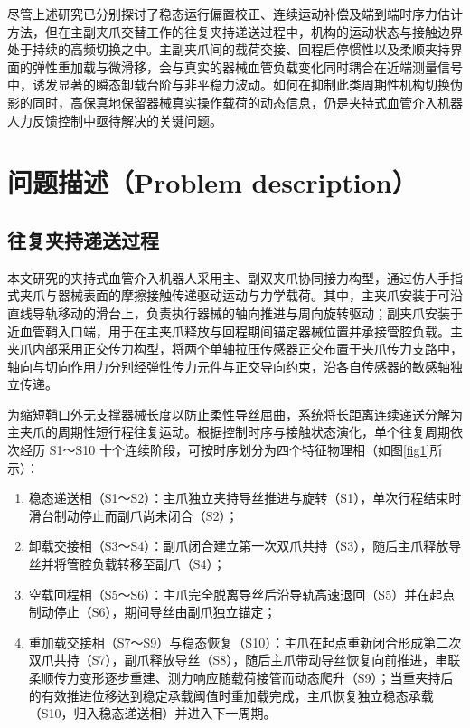 \documentclass{JQRnew}
\begin{document}
尽管上述研究已分别探讨了稳态运行偏置校正、连续运动补偿及端到端时序力估计方法，但在主副夹爪交替工作的往复夹持递送过程中，机构的运动状态与接触边界处于持续的高频切换之中。主副夹爪间的载荷交接、回程启停惯性以及柔顺夹持界面的弹性重加载与微滑移，会与真实的器械血管负载变化同时耦合在近端测量信号中，诱发显著的瞬态卸载台阶与非平稳力波动。如何在抑制此类周期性机构切换伪影的同时，高保真地保留器械真实操作载荷的动态信息，仍是夹持式血管介入机器人力反馈控制中亟待解决的关键问题。

\section{问题描述（Problem description）}

\subsection{往复夹持递送过程}

本文研究的夹持式血管介入机器人采用主、副双夹爪协同接力构型，通过仿人手指式夹爪与器械表面的摩擦接触传递驱动运动与力学载荷。其中，主夹爪安装于可沿直线导轨移动的滑台上，负责执行器械的轴向推进与周向旋转驱动；副夹爪安装于近血管鞘入口端，用于在主夹爪释放与回程期间锚定器械位置并承接管腔负载。主夹爪内部采用正交传力构型，将两个单轴拉压传感器正交布置于夹爪传力支路中，轴向与切向作用力分别经弹性传力元件与正交导向约束，沿各自传感器的敏感轴独立传递。

为缩短鞘口外无支撑器械长度以防止柔性导丝屈曲，系统将长距离连续递送分解为主夹爪的周期性短行程往复运动。根据控制时序与接触状态演化，单个往复周期依次经历 S1～S10 十个连续阶段，可按时序划分为四个特征物理相（如图\ref{fig1}所示）：
\begin{enumerate}
\item[1)] 稳态递送相（S1～S2）：主爪独立夹持导丝推进与旋转（S1），单次行程结束时滑台制动停止而副爪尚未闭合（S2）；
\item[2)] 卸载交接相（S3～S4）：副爪闭合建立第一次双爪共持（S3），随后主爪释放导丝并将管腔负载转移至副爪（S4）；
\item[3)] 空载回程相（S5～S6）：主爪完全脱离导丝后沿导轨高速退回（S5）并在起点制动停止（S6），期间导丝由副爪独立锚定；
\item[4)] 重加载交接相（S7～S9）与稳态恢复（S10）：主爪在起点重新闭合形成第二次双爪共持（S7），副爪释放导丝（S8），随后主爪带动导丝恢复向前推进，串联柔顺传力变形逐步重建、测力响应随载荷接管而动态爬升（S9）；当重夹持后的有效推进位移达到稳定承载阈值时重加载完成，主爪恢复独立稳态承载（S10，归入稳态递送相）并进入下一周期。
\end{enumerate}
\end{document}
